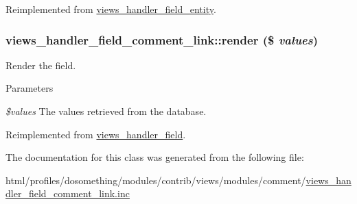 Reimplemented from \hyperlink{classviews__handler__field__entity_a71638207b6bd704ef4222b61f150c4af}{views\_\-handler\_\-field\_\-entity}.\hypertarget{classviews__handler__field__comment__link_ac5e8317cc1a0b2a7688f865662b27dae}{
\subsubsection[{render}]{\setlength{\rightskip}{0pt plus 5cm}views\_\-handler\_\-field\_\-comment\_\-link::render (\$ {\em values})}}
\label{classviews__handler__field__comment__link_ac5e8317cc1a0b2a7688f865662b27dae}
Render the field.


\begin{DoxyParams}{Parameters}
\item[{\em \$values}]The values retrieved from the database. \end{DoxyParams}


Reimplemented from \hyperlink{classviews__handler__field_a82ff951c5e9ceb97b2eab86f880cbc1e}{views\_\-handler\_\-field}.

The documentation for this class was generated from the following file:\begin{DoxyCompactItemize}
\item 
html/profiles/dosomething/modules/contrib/views/modules/comment/\hyperlink{views__handler__field__comment__link_8inc}{views\_\-handler\_\-field\_\-comment\_\-link.inc}\end{DoxyCompactItemize}
